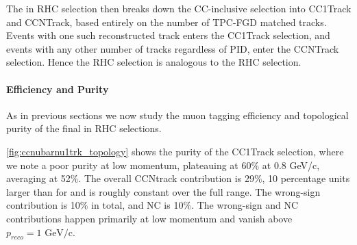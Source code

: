 The \numu in RHC selection then breaks down the CC-inclusive selection into CC1Track and CCNTrack, based entirely on the number of TPC-FGD matched tracks. Events with one such reconstructed track enters the CC1Track selection, and events with any other number of tracks regardless of PID, enter the CCNTrack selection. Hence the \numu RHC selection is analogous to the \numubar RHC selection.

\paragraph{Efficiency and Purity}
As in previous sections we now study the muon tagging efficiency and topological purity of the final \numu in RHC selections.

\autoref{fig:ccnubarnu1trk_topology} shows the purity of the CC1Track selection, where we note a poor purity at low momentum, plateauing at 60\% at 0.8 GeV/c, averaging at 52\%. The overall \numu CCNtrack contribution is 29\%, 10 percentage units larger than for \numubar and is roughly constant over the full range. The wrong-sign contribution is 10\% in total, and NC is 10\%. The wrong-sign and NC contributions happen primarily at low momentum and vanish above $p_{reco}=1\text{ GeV/c}$.
